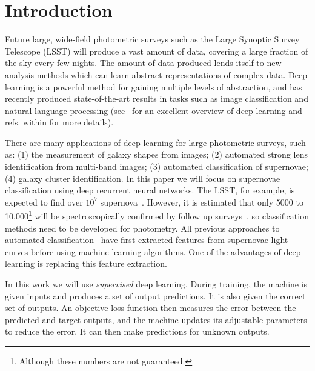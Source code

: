 \documentclass[twocolumn]{aastex61}
\begin{document}
\section{Introduction}

Future large, wide-field photometric surveys such as the Large Synoptic	Survey Telescope (LSST) will produce a vast amount of data, covering a large fraction of the sky every few nights. The amount of data produced lends itself to new analysis methods which can learn abstract representations of complex data. Deep learning is a powerful method for gaining multiple levels of abstraction, and has recently produced state-of-the-art results in tasks such as image classification and natural language processing (see~\cite{0483bd9444a348c8b59d54a190839ec9} for an excellent overview of deep learning and refs. within for more details).

There are many applications of deep learning for large photometric surveys, such as: (1) the measurement of galaxy shapes from images; (2) automated strong lens identification from multi-band images; (3) automated classification of supernovae; (4) galaxy cluster identification. In this paper we will focus on supernovae classification using deep recurrent neural networks. The LSST, for example, is expected to find over $10^7$ supernova~\cite{2009arXiv0912.0201L}. However,  it is estimated that only 5000 to 10,000\footnote{Although these numbers are not guaranteed.} will be spectroscopically confirmed  by follow up surveys~\cite{2013arXiv1311.2496M}, so classification methods need to be developed  for photometry.  All previous approaches to automated classification~\cite{Newling:2010bp, Karpenka:2012pm, Lochner:2016hbn} have first extracted features from supernovae light curves before using machine learning algorithms.  One of the advantages of deep learning is replacing this feature extraction. 

In this work we will use {\em supervised} deep learning. During training, the machine is given inputs and produces a set of output predictions.  It is also given the correct set of outputs. An objective loss function then measures the error between the predicted and target outputs, and the machine updates its adjustable parameters to reduce the error. It can then make predictions for unknown outputs.
\end{document}

